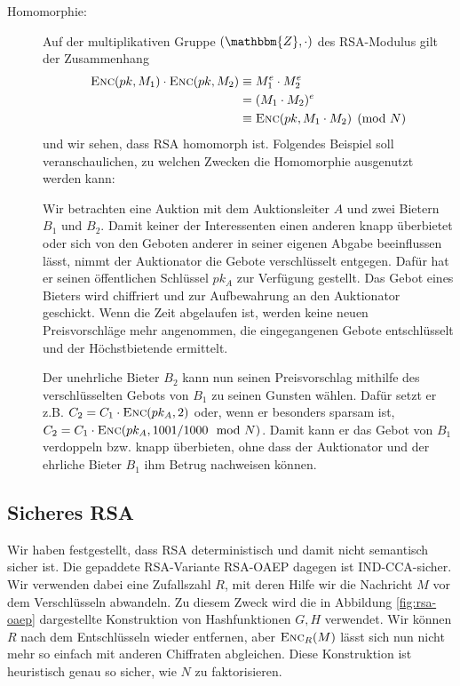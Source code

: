 \begin{description}
    \item[Homomorphie:] Auf der multiplikativen Gruppe $(\mathbbm{Z}, \cdot)$ des RSA-Modulus gilt der Zusammenhang
         \begin{equation*}
		\begin{split}
     			\textsc{Enc}(pk, M_1) \cdot \textsc{Enc}(pk, M_2) 	&\equiv M_1^e \cdot M_2^e\\
     										&= (M_1 \cdot M_2)^e\\
     										&\equiv \textsc{Enc}(pk, M_1 \cdot M_2) \pmod N
		\end{split}
     	\end{equation*}
    und wir sehen, dass RSA homomorph ist. 
    Folgendes Beispiel soll veranschaulichen, zu welchen Zwecken die Homomorphie ausgenutzt werden kann:   
    \begin{beispiel}
    	Wir betrachten eine Auktion mit dem Auktionsleiter $A$ und zwei Bietern $B_1$ und $B_2$. Damit keiner der Interessenten einen
    	anderen knapp überbietet oder sich von den Geboten anderer in seiner eigenen Abgabe beeinflussen lässt, nimmt der Auktionator die Gebote verschlüsselt entgegen. Dafür hat er seinen öffentlichen Schlüssel $pk_A$ zur Verfügung gestellt. Das Gebot eines Bieters wird chiffriert und zur Aufbewahrung an den Auktionator geschickt. Wenn die Zeit abgelaufen ist, werden keine neuen Preisvorschläge mehr angenommen, die eingegangenen Gebote entschlüsselt und der Höchstbietende ermittelt.
    
    	Der unehrliche Bieter $B_2$ kann nun seinen Preisvorschlag mithilfe des verschlüsselten Gebots von $B_1$ zu seinen Gunsten wählen. Dafür setzt er z.B. $C_2 =
    	C_1 \cdot \textsc{Enc}({pk_A, 2})$ oder, wenn er besonders sparsam ist, $C_2 = C_1 \cdot \textsc{Enc}({pk_A, 1001/1000 \mod N})$. Damit kann er das Gebot von $B_1$ verdoppeln
    	bzw. knapp überbieten, ohne dass der Auktionator und der ehrliche Bieter $B_1$ ihm Betrug nachweisen können.
    \end{beispiel}
\end{description} 

\subsection{Sicheres RSA}
Wir haben festgestellt, dass RSA deterministisch und damit nicht semantisch sicher ist. Die gepaddete RSA-Variante RSA-OAEP dagegen ist IND-CCA-sicher. Wir verwenden dabei eine Zufallszahl $R$, mit deren Hilfe wir die Nachricht $M$ vor dem Verschlüsseln abwandeln. Zu diesem Zweck wird die in Abbildung \ref{fig:rsa-oaep} dargestellte Konstruktion von Hashfunktionen $G, H$ verwendet. Wir können $R$ nach dem Entschlüsseln wieder entfernen, aber $\textsc{Enc}_R(M)$ lässt sich nun nicht mehr so einfach mit anderen Chiffraten abgleichen.
Diese Konstruktion ist heuristisch genau so sicher, wie $N$ zu faktorisieren.

